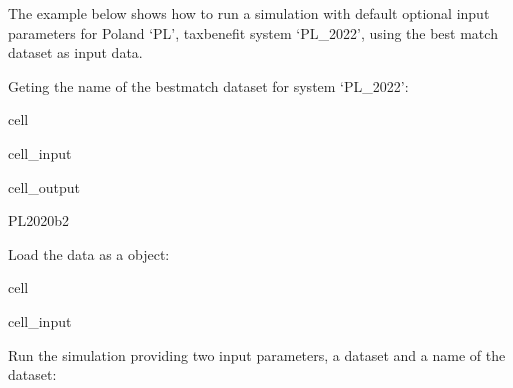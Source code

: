\documentclass[letterpaper,10pt,english]{sphinxmanual}
\begin{document}
\sphinxAtStartPar
The example below shows how to run a simulation with default optional input parameters for Poland ‘PL’, tax\sphinxhyphen{}benefit system ‘PL\_2022’, using the best match dataset as input data.

\sphinxAtStartPar
Geting the name of the best\sphinxhyphen{}match dataset for system ‘PL\_2022’:

\begin{sphinxuseclass}{cell}
\begin{sphinxuseclass}{cell_input}
\begin{sphinxVerbatim}[commandchars=\\\{\}]
  \PYG{p}{[}\PYG{p}{]}\PYG{p}{[}\PYG{p}{]}\PYG{p}{[}\PYG{p}{]}
\end{sphinxVerbatim}

\end{sphinxuseclass}
\begin{sphinxuseclass}{cell_output}
\begin{sphinxVerbatim}[commandchars=\\\{\}]
\PYGZsq{}PL\PYGZus{}2020\PYGZus{}b2\PYGZsq{}
\end{sphinxVerbatim}

\end{sphinxuseclass}
\end{sphinxuseclass}
\sphinxAtStartPar
Load the data as a  object:

\begin{sphinxuseclass}{cell}
\begin{sphinxuseclass}{cell_input}
\begin{sphinxVerbatim}[commandchars=\\\{\}]
   
 
  
  
\end{sphinxVerbatim}

\end{sphinxuseclass}
\end{sphinxuseclass}
\sphinxAtStartPar
Run the simulation providing two input parameters, a  dataset and a name of the dataset:
\end{document}
